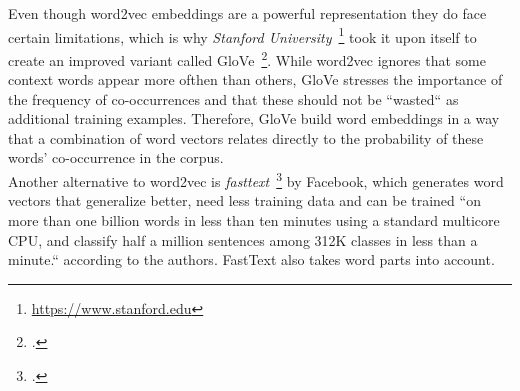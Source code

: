 Even though word2vec embeddings are a powerful representation they do face certain limitations, which is why \textit{Stanford University}~\footnote{\url{https://www.stanford.edu}} took it upon itself to create an improved variant called GloVe~\footcite{pennington-etal-2014-glove}. While word2vec ignores that some context words appear more ofthen than others, GloVe stresses the importance of the frequency of co-occurrences and that these should not be “wasted“ as additional training examples. Therefore, GloVe build word embeddings in a way that a combination of word vectors relates directly to the probability of these words' co-occurrence in the corpus. \\
Another alternative to word2vec is \textit{fasttext}~\footcite{DBLP:journals/corr/JoulinGBM16} by Facebook, which generates word vectors that generalize better, need less training data and can be trained “on more than one billion words in less than ten minutes using a standard multicore CPU, and classify half a million sentences among 312K classes in less than a minute.“ according to the authors. FastText also takes word parts into account.










